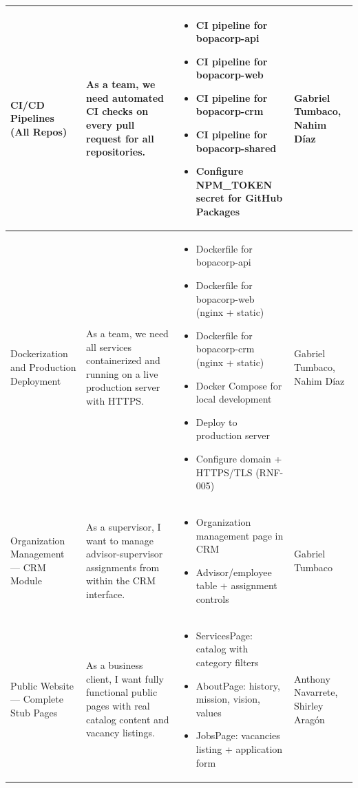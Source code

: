 \documentclass[letterpaper%
, oneside%
, 12pt%
, memoireprojet%
, english%
,creativecommons,hyperref, withAlgo2e %
]{thETS}
\begin{document}
\begin{longtable}{|p{3.2cm}|p{4.4cm}|p{5.4cm}|p{3.0cm}|}
CI/CD Pipelines (All Repos) & As a team, we need automated CI checks on every pull request for all repositories. & \begin{itemize}\setlength{\itemsep}{2pt}
    \item CI pipeline for bopacorp-api
    \item CI pipeline for bopacorp-web
    \item CI pipeline for bopacorp-crm
    \item CI pipeline for bopacorp-shared
    \item Configure NPM\_TOKEN secret for GitHub Packages
\end{itemize} & Gabriel Tumbaco, Nahim Díaz \\ \hline

Dockerization and Production Deployment & As a team, we need all services containerized and running on a live production server with HTTPS. & \begin{itemize}\setlength{\itemsep}{2pt}
    \item Dockerfile for bopacorp-api
    \item Dockerfile for bopacorp-web (nginx + static)
    \item Dockerfile for bopacorp-crm (nginx + static)
    \item Docker Compose for local development
    \item Deploy to production server
    \item Configure domain + HTTPS/TLS (RNF-005)
\end{itemize} & Gabriel Tumbaco, Nahim Díaz \\ \hline

Organization Management — CRM Module & As a supervisor, I want to manage advisor-supervisor assignments from within the CRM interface. & \begin{itemize}\setlength{\itemsep}{2pt}
    \item Organization management page in CRM
    \item Advisor/employee table + assignment controls
\end{itemize} & Gabriel Tumbaco \\ \hline

Public Website — Complete Stub Pages & As a business client, I want fully functional public pages with real catalog content and vacancy listings. & \begin{itemize}\setlength{\itemsep}{2pt}
    \item ServicesPage: catalog with category filters
    \item AboutPage: history, mission, vision, values
    \item JobsPage: vacancies listing + application form
\end{itemize} & Anthony Navarrete, Shirley Aragón \\ \hline


\end{longtable}
\end{document}
